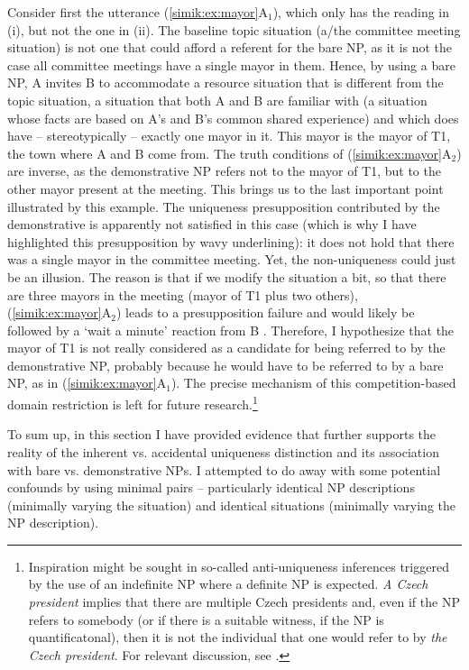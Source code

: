 \documentclass[output=paper,colorlinks,citecolor=brown,newtxmath]{langscibook}
\begin{document}
\noindent Consider first the utterance (\ref{simik:ex:mayor}A$_1$), which only has the reading in (i), but not the one in (ii). The baseline topic situation (a/the committee meeting situation) is not one that could afford a referent for the bare NP, as it is not the case all committee meetings have a single mayor in them. Hence, by using a bare NP, A invites B to accommodate a resource situation that is different from the topic situation, a situation that both A and B are familiar with (a situation whose facts are based on A's and B's common shared experience) and which does have -- stereotypically -- exactly one mayor in it. This mayor is the mayor of T1, the town where A and B come from. The truth conditions of (\ref{simik:ex:mayor}A$_2$) are inverse, as the demonstrative NP refers not to the mayor of T1, but to the other mayor present at the meeting. This brings us to the last important point illustrated by this example. The uniqueness presupposition contributed by the demonstrative is apparently not satisfied in this case (which is why I have highlighted this presupposition by wavy underlining): it does not hold that there was a single mayor in the committee meeting. Yet, the non-uniqueness could just be an illusion. The reason is that if we modify the situation a bit, so that there are three mayors in the meeting (mayor of T1 plus two others), (\ref{simik:ex:mayor}A$_2$) leads to a presupposition failure and would likely be followed by a `wait a minute' reaction from B \citep{vonFintel2008}. Therefore, I hypothesize that the mayor of T1 is not really considered as a candidate for being referred to by the demonstrative NP, probably because he would have to be referred to by a bare NP, as in (\ref{simik:ex:mayor}A$_1$). The precise mechanism of this competition-based domain restriction is left for future research.\footnote{Inspiration might be sought in so-called anti-uniqueness inferences triggered by the use of an indefinite NP where a definite NP is expected. \textit{A Czech president} implies that there are multiple Czech presidents and, even if the NP refers to somebody (or if there is a suitable witness, if the NP is quantificatonal), then it is not the individual that one would refer to by \textit{the Czech president}. For relevant discussion, see \citet{Hawkins1978,Heim1991,Sauerland2008}.}

To sum up, in this section I have provided evidence that further supports the reality of the inherent vs. accidental uniqueness distinction and its association with bare vs. demonstrative NPs. I attempted to do away with some potential confounds by using minimal pairs -- particularly identical NP descriptions (minimally varying the situation) and identical situations (minimally varying the NP description).
\end{document}
